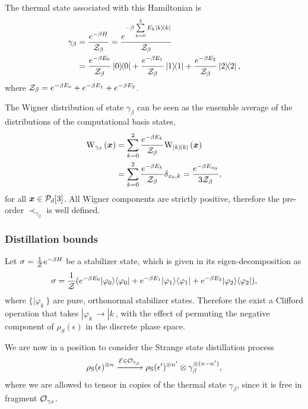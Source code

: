 \documentclass[pra,
aps,
twocolumn,
superscriptaddress,
groupedaddress,
nofootinbib,
reprint
]{revtex4-1}
\begin{document}
The thermal state associated with this Hamiltonian is
\begin{align}
	\gamma_\beta &= \frac{e^{-\beta H}}{\mathcal{Z}_\beta} = \frac{e^{-\beta \sum\limits_{k=0}^2 E_k \ketbra{k}}}{\mathcal{Z}_\beta} \\
	&= \frac{e^{-\beta E_0}}{\mathcal{Z}_\beta}\ketbra{0} + \frac{e^{-\beta E_1}}{\mathcal{Z}_\beta}\ketbra{1} + \frac{e^{-\beta E_2}}{\mathcal{Z}_\beta}\ketbra{2},
\end{align}
where $\mathcal{Z}_\beta = e^{-\beta E_0} + e^{-\beta E_1} + e^{-\beta E_2}$.

The Wigner distribution of state $\gamma_\beta$ can be seen as the ensemble average of the distributions of the computational basis states,
\begin{align}
	\W[\bmx]{\gamma_\beta} &= \sum\limits_{k=0}^2 \frac{e^{-\beta E_k}}{\Z_\beta}\W[\bmx]{\ketbra{k}} \\
	&= \sum\limits_{k=0}^2 \frac{e^{-\beta E_k}}{\Z_\beta} \delta_{x_0, k} = \frac{e^{-\beta E_{x_0}}}{3\Z_\beta},
\end{align}
for all $\bm{x} \in \mathcal{P}_d[3]$. 
All Wigner components are strictly positive, therefore the pre-order $\prec_{\gamma_\beta}$ is well defined.


\subsubsection{Distillation bounds}

Let $\sigma = \frac{1}{\mathcal{Z}} e^{-\beta H}$ be a stabilizer state, which is given in its eigen-decomposition as 
\begin{equation}
\sigma = \frac{1}{\mathcal{Z}} ( e^{-\beta E_0} |\varphi_0\rangle\langle \varphi_0| + e^{-\beta E_1} |\varphi_1\rangle\langle \varphi_1| + e^{-\beta E_2} |\varphi_2\rangle\langle \varphi_2| ),
\end{equation}
where $\{|\varphi_k\>\}$ are pure, orthonormal stabilizer states. Therefore the exist a Clifford operation that takes $|\varphi_k\> \rightarrow |k\>$, with the effect of permuting the negative component of $\rho_S(\epsilon)$ in the discrete phase space.

We are now in a position to consider the Strange state distillation process
\begin{equation}\label{eq:msd_thermal}
		\rho_{\rm{S}}(\epsilon)^{\otimes n} \xrightarrow{\mathcal{E} \in \mathcal{O}_{\gamma_\beta}} \rho_{\rm{S}}(\epsilon')^{\otimes n'} \otimes \gamma_\beta^{\otimes (n-n')},
\end{equation}
where we are allowed to tensor in copies of the thermal state $\gamma_\beta$, since it is free in fragment $\mathcal{O}_{\gamma_\beta}$.
\end{document}
